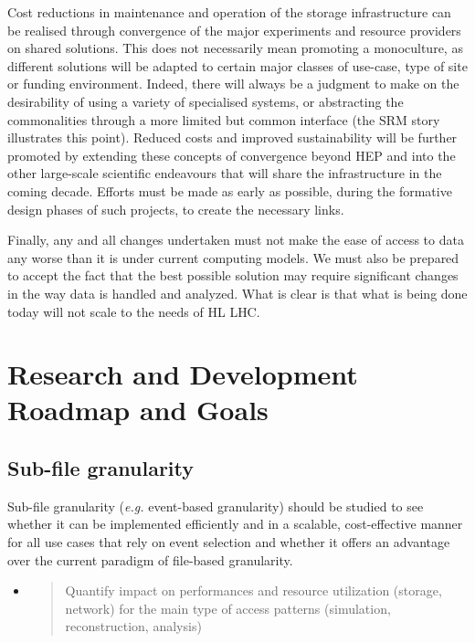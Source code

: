\documentclass[12pt,a4paper]{article}
\begin{document}
Cost reductions in maintenance and operation of the storage
infrastructure can be realised through convergence of the major
experiments and resource providers on shared solutions. This does not
necessarily mean promoting a monoculture, as different solutions will be
adapted to certain major classes of use-case, type of site or funding
environment. Indeed, there will always be a judgment to make on the
desirability of using a variety of specialised systems, or abstracting
the commonalities through a more limited but common interface (the SRM
story illustrates this point). Reduced costs and improved sustainability
will be further promoted by extending these concepts of convergence
beyond HEP and into the other large-scale scientific endeavours that
will share the infrastructure in the coming decade. Efforts must be made
as early as possible, during the formative design phases of such
projects, to create the necessary links.

Finally, any and all changes undertaken must not make the ease of access
to data any worse than it is under current computing models. We must
also be prepared to accept the fact that the best possible solution may
require significant changes in the way data is handled and analyzed.
What is clear is that what is being done today will not scale to the
needs of HL LHC.

\section{Research and Development Roadmap and
Goals}\label{research-and-development-roadmap-and-goals}

\subsection{Sub-file granularity}\label{sub-file-granularity}
Sub-file granularity ({\it e.g.} event-based granularity) should be studied to see
whether it can be implemented efficiently and in a scalable, cost-effective manner for
all use cases that rely on event selection and whether it offers an advantage over
the current paradigm of file-based granularity.

\begin{itemize}
\item
  \begin{quote}
  \protect\hypertarget{_xbbh0qorjpnn}{}{}Quantify impact on performances
  and resource utilization (storage, network) for the main type of
  access patterns (simulation, reconstruction, analysis)
  \end{quote}
\end{itemize}
\end{document}
